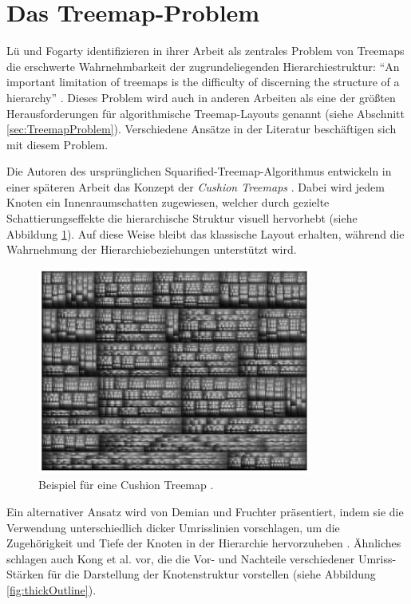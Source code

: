  


\section{Das Treemap-Problem}
Lü und Fogarty identifizieren in ihrer Arbeit \cite{lu2008cascaded} als zentrales Problem von Treemaps die erschwerte Wahrnehmbarkeit der zugrundeliegenden Hierarchiestruktur: \enquote{An important limitation of treemaps is the difficulty of discerning the structure of a hierarchy} \cite[1]{lu2008cascaded}. Dieses Problem wird auch in anderen Arbeiten als eine der größten Herausforderungen für algorithmische Treemap-Layouts genannt (siehe Abschnitt \ref{sec:TreemapProblem}). Verschiedene Ansätze in der Literatur beschäftigen sich mit diesem Problem.

Die Autoren des ursprünglichen Squarified-Treemap-Algorithmus \cite{bruls2000squarified} entwickeln in einer späteren Arbeit das Konzept der \textit{Cushion Treemaps} \cite{cushionTreemaps}. Dabei wird jedem Knoten ein Innenraumschatten zugewiesen, welcher durch gezielte Schattierungseffekte die hierarchische Struktur visuell hervorhebt (siehe Abbildung \ref{fig:cushion}). Auf diese Weise bleibt das klassische Layout erhalten, während die Wahrnehmung der Hierarchiebeziehungen unterstützt wird.

\begin{figure}
    \centering
    \includegraphics[width=0.8\textwidth]{images/cushionTreemap.png}
    \caption{Beispiel für eine Cushion Treemap \cite[4]{cushionTreemaps}.}
    \label{fig:cushion}
\end{figure}

Ein alternativer Ansatz wird von Demian und Fruchter präsentiert, indem sie die Verwendung unterschiedlich dicker Umrisslinien vorschlagen, um die Zugehörigkeit und Tiefe der Knoten in der Hierarchie hervorzuheben \cite{largeHierarchicalRepositories}. Ähnliches schlagen auch Kong et al. vor, die die Vor- und Nachteile verschiedener Umriss-Stärken für die Darstellung der Knotenstruktur vorstellen \cite{2010-perception-treemaps} (siehe Abbildung \ref{fig:thickOutline}).

